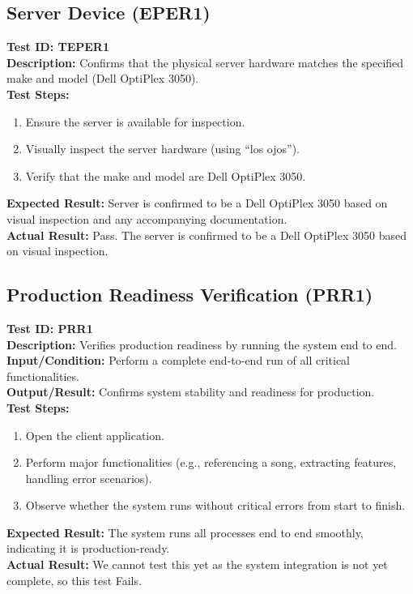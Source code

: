\documentclass[12pt, titlepage]{article}
\begin{document}
\subsection{Server Device (EPER1)}
\textbf{Test ID: TEPER1}\\
\textbf{Description:} Confirms that the physical server hardware matches the specified make and model (Dell OptiPlex 3050).\\
\textbf{Test Steps:}
\begin{enumerate}
    \item Ensure the server is available for inspection.
    \item Visually inspect the server hardware (using ``los ojos'').
    \item Verify that the make and model are Dell OptiPlex 3050.
\end{enumerate}
\textbf{Expected Result:} Server is confirmed to be a Dell OptiPlex 3050 based on visual inspection and any accompanying documentation.\\
\textbf{Actual Result:} Pass. The server is confirmed to be a Dell OptiPlex 3050 based on visual inspection.

\subsection{Production Readiness Verification (PRR1)}
\textbf{Test ID: PRR1}\\
\textbf{Description:} Verifies production readiness by running the system end to end.\\
\textbf{Input/Condition:} Perform a complete end-to-end run of all critical functionalities.\\
\textbf{Output/Result:} Confirms system stability and readiness for production.\\
\textbf{Test Steps:}
\begin{enumerate}
    \item Open the client application.
    \item Perform major functionalities (e.g., referencing a song, extracting features, handling error scenarios).
    \item Observe whether the system runs without critical errors from start to finish.
\end{enumerate}
\textbf{Expected Result:} The system runs all processes end to end smoothly, indicating it is production-ready.\\
\textbf{Actual Result:} We cannot test this yet as the system integration is not yet complete, so this test Fails.
\end{document}
